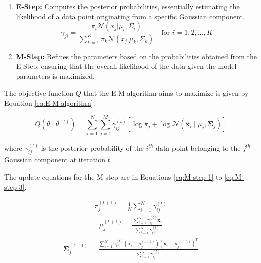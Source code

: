 \documentclass[lettersize,journal]{IEEEtran}
\begin{document}
	\begin{enumerate}
		\item \textbf{E-Step:} Computes the posterior probabilities, essentially estimating the likelihood of a data point originating from a specific Gaussian component. 
		\begin{equation}\label{eq:E-Step}
			\gamma_{ji} = \frac{\pi_i \mathcal{N}(x_j | \mu_i, \Sigma_i)}{\sum_{k=1}^{K} \pi_k \mathcal{N}(x_j | \mu_k, \Sigma_k)} \quad \text{for } i = 1, 2, \dots, K
		\end{equation}
		\item \textbf{M-Step:} Refines the parameters based on the probabilities obtained from the E-Step, ensuring that the overall likelihood of the data given the model parameters is maximized.
	\end{enumerate}
	
	The objective function $Q$ that the E-M algorithm aims to maximize is
	given by Equation \ref{eq:E-M-algorithm}.
	
	\begin{equation}\label{eq:E-M-algorithm}
		Q\left(\theta \mid \theta^{(t)}\right)=\sum_{i=1}^N \sum_{j=1}^M \gamma_{i j}^{(t)}\left[\log \pi_j+\log \mathcal{N}\left(\mathbf{x}_i \mid \mu_j, \mathbf{\Sigma}_j\right)\right]
	\end{equation}
	
	where $\gamma_{i j}^{(t)}$ is the posterior probability of the $i^{t h}$ data point belonging to the $j^{{th }}$ Gaussian component at iteration $t$.
	
	The update equations for the M-step are in Equations \ref{eq:M-step-1} to \ref{eq:M-step-3}.
	
	\begin{align}\label{eq:M-step-1}
		\pi_j^{(t+1)}=\frac{1}{N} \sum_{i=1}^N \gamma_{i j}^{(t)}
	\end{align}
	\begin{align}\label{eq:M-step-2}
		\mu_j^{(t+1)}=\frac{\sum_{i=1}^N \gamma_{i j}^{(t)} \mathbf{x}_i}{\sum_{i=1}^N \gamma_{i j}^{(t)}}
	\end{align}
	\begin{align}\label{eq:M-step-3}
		\mathbf{\Sigma}_j^{(t+1)}=\frac{\sum_{i=1}^N \gamma_{i j}^{(t)}\left(\mathbf{x}_i-\mu_j^{(t+1)}\right)\left(\mathbf{x}_i-\mu_j^{(t+1)}\right)^T}{\sum_{i=1}^N \gamma_{i j}^{(t)}} 
	\end{align}
	
\end{document}
